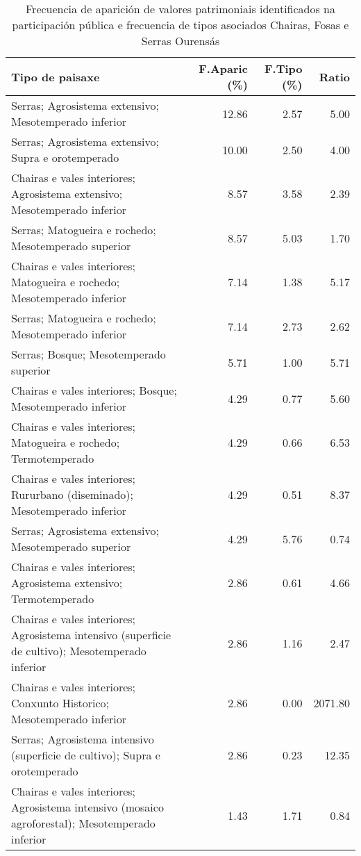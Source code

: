 \begin{table}[p]
\centering
\caption{Frecuencia de aparición de valores patrimoniais identificados na participación pública e frecuencia de tipos asociados Chairas, Fosas e Serras Ourensás} 
\label{vsixotpat8}
\begin{tabular}{lrrr}
  \hline
Tipo de paisaxe & F.Aparic (\%) & F.Tipo (\%) & Ratio \\ 
  \hline
Serras; Agrosistema extensivo; Mesotemperado inferior & 12.86 & 2.57 & 5.00 \\ 
  Serras; Agrosistema extensivo; Supra e orotemperado & 10.00 & 2.50 & 4.00 \\ 
  Chairas e vales interiores; Agrosistema extensivo; Mesotemperado inferior & 8.57 & 3.58 & 2.39 \\ 
  Serras; Matogueira e rochedo; Mesotemperado superior & 8.57 & 5.03 & 1.70 \\ 
  Chairas e vales interiores; Matogueira e rochedo; Mesotemperado inferior & 7.14 & 1.38 & 5.17 \\ 
  Serras; Matogueira e rochedo; Mesotemperado inferior & 7.14 & 2.73 & 2.62 \\ 
  Serras; Bosque; Mesotemperado superior & 5.71 & 1.00 & 5.71 \\ 
  Chairas e vales interiores; Bosque; Mesotemperado inferior & 4.29 & 0.77 & 5.60 \\ 
  Chairas e vales interiores; Matogueira e rochedo; Termotemperado & 4.29 & 0.66 & 6.53 \\ 
  Chairas e vales interiores; Rururbano (diseminado); Mesotemperado inferior & 4.29 & 0.51 & 8.37 \\ 
  Serras; Agrosistema extensivo; Mesotemperado superior & 4.29 & 5.76 & 0.74 \\ 
  Chairas e vales interiores; Agrosistema extensivo; Termotemperado & 2.86 & 0.61 & 4.66 \\ 
  Chairas e vales interiores; Agrosistema intensivo (superficie de cultivo); Mesotemperado inferior & 2.86 & 1.16 & 2.47 \\ 
  Chairas e vales interiores; Conxunto Historico; Mesotemperado inferior & 2.86 & 0.00 & 2071.80 \\ 
  Serras; Agrosistema intensivo (superficie de cultivo); Supra e orotemperado & 2.86 & 0.23 & 12.35 \\ 
  Chairas e vales interiores; Agrosistema intensivo (mosaico agroforestal); Mesotemperado inferior & 1.43 & 1.71 & 0.84 \\ 

\end{tabular}
\end{table}
